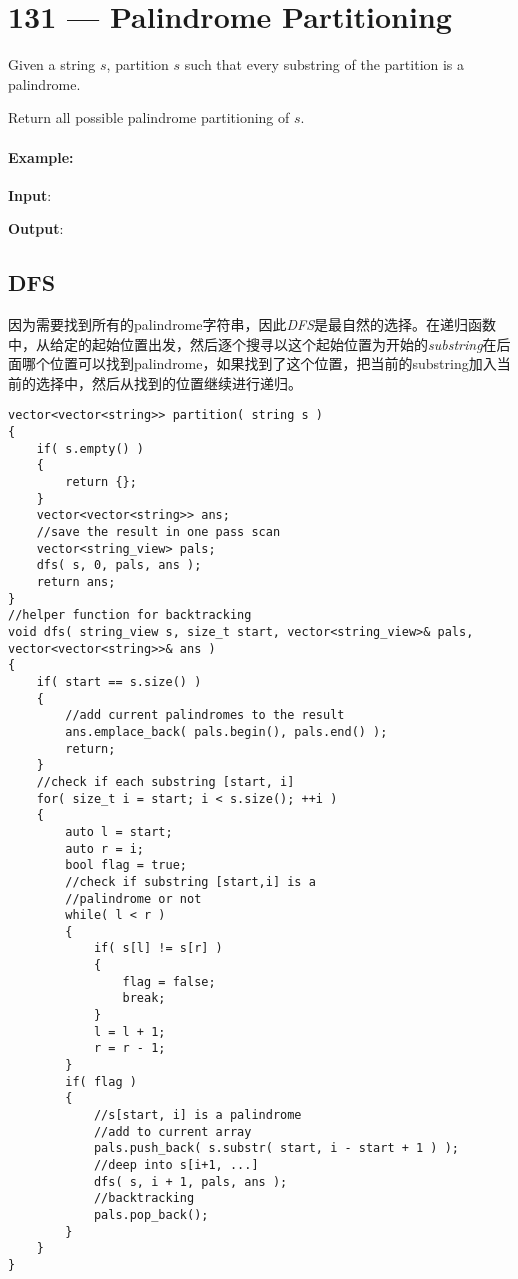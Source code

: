 \section{131 --- Palindrome Partitioning}
Given a string $s$, partition $s$ such that every substring of the partition is a palindrome.
\par
Return all possible palindrome partitioning of $s$.
\paragraph{Example:}
\begin{flushleft}
\textbf{Input}: 

\textbf{Output}:

\fcj{["aa","b"]}

\fcj{[a","a","b"]}
\end{flushleft}

\subsection{DFS}

因为需要找到所有的palindrome字符串，因此\textit{DFS}是最自然的选择。在递归函数中，从给定的起始位置出发，然后逐个搜寻以这个起始位置为开始的\textit{substring}在后面哪个位置可以找到palindrome，如果找到了这个位置，把当前的substring加入当前的选择中，然后从找到的位置继续进行递归。

\setcounter{lstlisting}{0}
\begin{lstlisting}[style=customc, caption={DFS}]
vector<vector<string>> partition( string s )
{
    if( s.empty() )
    {
        return {};
    }
    vector<vector<string>> ans;
    //save the result in one pass scan
    vector<string_view> pals;
    dfs( s, 0, pals, ans );
    return ans;
}
//helper function for backtracking
void dfs( string_view s, size_t start, vector<string_view>& pals, vector<vector<string>>& ans )
{
    if( start == s.size() )
    {
        //add current palindromes to the result
        ans.emplace_back( pals.begin(), pals.end() );
        return;
    }
    //check if each substring [start, i]
    for( size_t i = start; i < s.size(); ++i )
    {
        auto l = start;
        auto r = i;
        bool flag = true;
        //check if substring [start,i] is a
        //palindrome or not
        while( l < r )
        {
            if( s[l] != s[r] )
            {
                flag = false;
                break;
            }
            l = l + 1;
            r = r - 1;
        }
        if( flag )
        {
            //s[start, i] is a palindrome
            //add to current array
            pals.push_back( s.substr( start, i - start + 1 ) );
            //deep into s[i+1, ...]
            dfs( s, i + 1, pals, ans );
            //backtracking
            pals.pop_back();
        }
    }
}
\end{lstlisting}